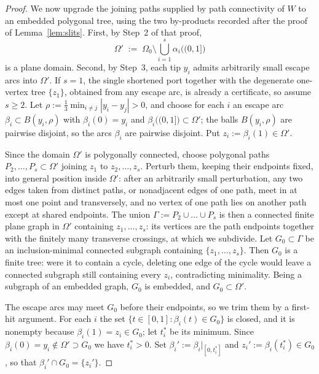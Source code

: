\documentclass[11pt,reqno]{amsart}
\theoremstyle{definition}
\theoremstyle{remark}
\begin{document}
\begin{proof}
We now upgrade the joining paths supplied by path connectivity of $W$ to an embedded
polygonal tree, using the two by-products recorded after the proof of
Lemma~\ref{lem:slits}. First, by Step~2 of that proof,
\[
\Omega'\;:=\;\Omega_0\setminus\bigcup_{i=1}^{s}\alpha_i\bigl((0,1]\bigr)
\]
is a plane domain. Second, by Step~3, each tip $y_i$ admits arbitrarily small escape
arcs into $\Omega'$. If $s=1$, the single shortened port together with the degenerate
one-vertex tree $\{z_1\}$, obtained from any escape arc, is already a certificate, so
assume $s\ge2$. Let $\rho:=\tfrac13\min_{i\neq j}|y_i-y_j|>0$, and choose for each
$i$ an escape arc $\beta_i\subset B(y_i,\rho)$ with $\beta_i(0)=y_i$ and
$\beta_i\bigl((0,1]\bigr)\subset\Omega'$; the balls $B(y_i,\rho)$ are pairwise
disjoint, so the arcs $\beta_i$ are pairwise disjoint. Put $z_i:=\beta_i(1)\in\Omega'$.

Since the domain $\Omega'$ is polygonally connected, choose polygonal paths
$P_2,\dots,P_s\subset\Omega'$ joining $z_1$ to $z_2,\dots,z_s$. Perturb them, keeping
their endpoints fixed, into general position inside $\Omega'$: after an arbitrarily
small perturbation, any two edges taken from distinct paths, or nonadjacent edges of one
path, meet in at most one point and transversely, and no vertex of one path lies on
another path except at shared endpoints. The union $\Gamma:=P_2\cup\dots\cup P_s$ is
then a connected finite plane graph in $\Omega'$ containing $z_1,\dots,z_s$: its
vertices are the path endpoints together with the finitely many transverse crossings, at
which we subdivide. Let $G_0\subset\Gamma$ be an inclusion-minimal connected subgraph
containing $\{z_1,\dots,z_s\}$. Then $G_0$ is a finite tree: were it to contain a
cycle, deleting one edge of the cycle would leave a connected subgraph still containing
every $z_i$, contradicting minimality. Being a subgraph of an embedded graph, $G_0$ is
embedded, and $G_0\subset\Omega'$.

The escape arcs may meet $G_0$ before their endpoints, so we trim them by a first-hit
argument. For each $i$ the set $\{t\in[0,1]:\beta_i(t)\in G_0\}$ is closed, and it is
nonempty because $\beta_i(1)=z_i\in G_0$; let $t_i^{*}$ be its minimum. Since
$\beta_i(0)=y_i\notin\Omega'\supset G_0$ we have $t_i^{*}>0$. Set
$\beta_i':=\beta_i|_{[0,t_i^{*}]}$ and $z_i':=\beta_i(t_i^{*})\in G_0$, so that
$\beta_i'\cap G_0=\{z_i'\}$.


\end{proof}
\end{document}
